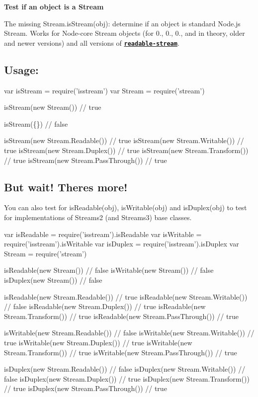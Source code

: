 \href{http://travis-ci.org/rvagg/isstream}{\tt }

{\bfseries Test if an object is a {\ttfamily Stream}}

\href{https://nodei.co/npm/isstream/}{\tt }

The missing {\ttfamily Stream.\+is\+Stream(obj)}\+: determine if an object is standard Node.\+js {\ttfamily Stream}. Works for Node-\/core {\ttfamily Stream} objects (for 0., 0., 0., and in theory, older and newer versions) and all versions of {\bfseries \href{https://github.com/isaacs/readable-stream}{\tt readable-\/stream}}.

\subsection*{Usage\+:}


\begin{DoxyCode}
var isStream = require('isstream')
var Stream = require('stream')

isStream(new Stream()) // true

isStream(\{\}) // false

isStream(new Stream.Readable())    // true
isStream(new Stream.Writable())    // true
isStream(new Stream.Duplex())      // true
isStream(new Stream.Transform())   // true
isStream(new Stream.PassThrough()) // true
\end{DoxyCode}


\subsection*{But wait! There\textquotesingle{}s more!}

You can also test for {\ttfamily is\+Readable(obj)}, {\ttfamily is\+Writable(obj)} and {\ttfamily is\+Duplex(obj)} to test for implementations of Streams2 (and Streams3) base classes.


\begin{DoxyCode}
var isReadable = require('isstream').isReadable
var isWritable = require('isstream').isWritable
var isDuplex = require('isstream').isDuplex
var Stream = require('stream')

isReadable(new Stream()) // false
isWritable(new Stream()) // false
isDuplex(new Stream())   // false

isReadable(new Stream.Readable())    // true
isReadable(new Stream.Writable())    // false
isReadable(new Stream.Duplex())      // true
isReadable(new Stream.Transform())   // true
isReadable(new Stream.PassThrough()) // true

isWritable(new Stream.Readable())    // false
isWritable(new Stream.Writable())    // true
isWritable(new Stream.Duplex())      // true
isWritable(new Stream.Transform())   // true
isWritable(new Stream.PassThrough()) // true

isDuplex(new Stream.Readable())    // false
isDuplex(new Stream.Writable())    // false
isDuplex(new Stream.Duplex())      // true
isDuplex(new Stream.Transform())   // true
isDuplex(new Stream.PassThrough()) // true
\end{DoxyCode}


